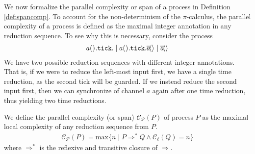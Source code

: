 We now formalize the parallel complexity or span of a process in Definition \ref{def:spancomp}. To account for the non-determinism of the $\pi$-calculus, the parallel complexity of a process is defined as the maximal integer annotation in any reduction sequence. To see why this is necessary, consider the process
%
\begin{align*}
    a()^{}.\texttt{tick}.\mid a()^{}.\texttt{tick}.\overline{a}\!\langle \rangle^{} \mid \overline{a}\!\langle \rangle^{}
\end{align*}
%
We have two possible reduction sequences with different integer annotations. That is, if we were to reduce the left-most input first, we have a single time reduction, as the second tick will be guarded. If we instead reduce the second input first, then we can synchronize of channel $a$ again after one time reduction, thus yielding two time reductions.
%
\begin{defi}\label{def:spancomp}
We define the parallel complexity (or span) $\mathcal{C}_{\mathcal{P}}(P)$ of process $P$ as the maximal local complexity of any reduction sequence from $P$.
\begin{align*}
    \mathcal{C}_{\mathcal{P}}(P) = \text{max}\{n \mid P \Longrightarrow^* Q \land \mathcal{C}_\ell(Q) = n\}
\end{align*}
where $\Longrightarrow^*$ is the reflexive and transitive closure of $\Longrightarrow$.
\end{defi}



